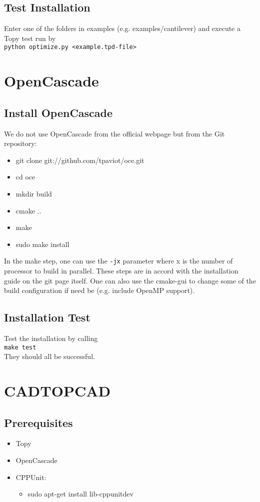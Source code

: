 \documentclass[11pt,a4paper,bibtotoc,idxtotoc,headsepline,footsepline,footexclude,DIV13,oneside]{scrbook}
\begin{document}
	\section{Test Installation}
	Enter one of the folders in examples (e.g. examples/cantilever) and execute a Topy test run by \\
	\texttt{python optimize.py <example.tpd-file>} \\
	
	\chapter{OpenCascade}
	\section{Install OpenCascade}
	We do not use OpenCascade from the official webpage but from the Git repository:
	\begin{itemize}
	\item git clone git://github.com/tpaviot/oce.git
	\item cd oce
	\item mkdir build
	\item cmake .. 
	\item make 
	\item sudo make install  
	\end{itemize}
	In the make step, one can use the \texttt{-jx} parameter where x is the number of processor to build in parallel. These steps are in accord with the installation guide on the git page itself. One can also use the cmake-gui  to change some of the build configuration if need be (e.g. include OpenMP support).
	\section{Installation Test}
	Test the installation by calling \\
	\texttt{make test} \\
	They should all be successful.
	
	\chapter{CADTOPCAD}
	\section{Prerequisites}
	\begin{itemize}
	\item Topy
	\item OpenCascade
	\item CPPUnit:
		\begin{itemize}
		\item sudo apt-get install lib-cppunitdev
		\end{itemize}
	\end{itemize}

  	\clearemptydoublepage
	
 
\end{document}
